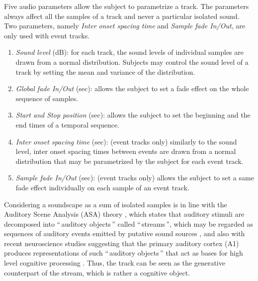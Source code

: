\documentclass[twoside,twocolumn]{article}
\begin{document}
Five audio parameters allow the subject to parametrize a track. The parameters always affect all the samples of a track and never a particular isolated sound. Two parameters, namely \textit{Inter onset spacing time} and \textit{Sample fade In/Out}, are only used with event tracks. 

\begin{enumerate}
\item \textit{Sound level} (dB): for each track, the sound levels of individual samples are drawn from a normal distribution. Subjects may control the sound level of a track by setting the mean and variance of the distribution. 
\item \textit{Global fade In/Out} (sec):  allows the subject to set a fade effect on the whole sequence of samples. 
\item \textit{Start and Stop position} (sec): allows the subject to set the beginning and the end times of a temporal sequence.
\item \textit{Inter onset spacing time} (sec): (event tracks only) similarly to the sound level, inter onset spacing times between events are drawn from a normal distribution that may be parametrized by the subject for each event track.
\item \textit{Sample fade In/Out} (sec): (event tracks only) allows the subject to set a same fade effect individually on each sample of an event track.
\end{enumerate}

Considering a soundscape as a sum of isolated samples is in line with the Auditory Scene Analysis (ASA) theory \cite{bregman1994auditory}, which states that auditory stimuli are decomposed into ``\,auditory objects\,'' called ``\,streams\,'', which may be regarded as sequences of auditory events emitted by putative sound sources \cite{ciocca2007auditory,winkler2009modeling}, and also with recent neuroscience studies suggesting that the primary auditory cortex (A1) produces representations of such ``\,auditory objects\,'' that act as bases for high level cognitive processing \cite{nelken2008neurons}. Thus, the track can be seen as the generative counterpart of the stream, which is rather a cognitive object.

\end{document}
